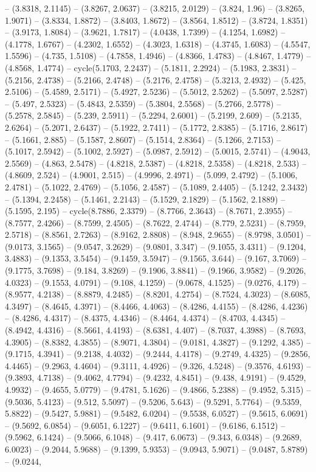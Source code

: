 -- (3.8318, 2.1145) -- (3.8267, 2.0637) -- (3.8215, 2.0129) -- (3.824, 1.96) -- (3.8265, 1.9071) -- (3.8334, 1.8872) -- (3.8403, 1.8672) -- (3.8564, 1.8512) -- (3.8724, 1.8351) -- (3.9173, 1.8084) -- (3.9621, 1.7817) -- (4.0438, 1.7399) -- (4.1254, 1.6982) -- (4.1778, 1.6767) -- (4.2302, 1.6552) -- (4.3023, 1.6318) -- (4.3745, 1.6083) -- (4.5547, 1.5596) -- (4.735, 1.5108) -- (4.7858, 1.4946) -- (4.8366, 1.4783) -- (4.8467, 1.4779) -- (4.8568, 1.4774) -- cycle(5.1703, 2.2437) -- (5.1811, 2.2924) -- (5.1983, 2.3831) -- (5.2156, 2.4738) -- (5.2166, 2.4748) -- (5.2176, 2.4758) -- (5.3213, 2.4932) -- (5.425, 2.5106) -- (5.4589, 2.5171) -- (5.4927, 2.5236) -- (5.5012, 2.5262) -- (5.5097, 2.5287) -- (5.497, 2.5323) -- (5.4843, 2.5359) -- (5.3804, 2.5568) -- (5.2766, 2.5778) -- (5.2578, 2.5845) -- (5.239, 2.5911) -- (5.2294, 2.6001) -- (5.2199, 2.609) -- (5.2135, 2.6264) -- (5.2071, 2.6437) -- (5.1922, 2.7411) -- (5.1772, 2.8385) -- (5.1716, 2.8617) -- (5.1661, 2.885) -- (5.1587, 2.8607) -- (5.1514, 2.8364) -- (5.1266, 2.7153) -- (5.1017, 2.5942) -- (5.1002, 2.5927) -- (5.0987, 2.5912) -- (5.0015, 2.5741) -- (4.9043, 2.5569) -- (4.863, 2.5478) -- (4.8218, 2.5387) -- (4.8218, 2.5358) -- (4.8218, 2.533) -- (4.8609, 2.524) -- (4.9001, 2.515) -- (4.9996, 2.4971) -- (5.099, 2.4792) -- (5.1006, 2.4781) -- (5.1022, 2.4769) -- (5.1056, 2.4587) -- (5.1089, 2.4405) -- (5.1242, 2.3432) -- (5.1394, 2.2458) -- (5.1461, 2.2143) -- (5.1529, 2.1829) -- (5.1562, 2.1889) -- (5.1595, 2.195) -- cycle(8.7886, 2.3379) -- (8.7766, 2.3643) -- (8.7671, 2.3955) -- (8.7577, 2.4266) -- (8.7599, 2.4505) -- (8.7622, 2.4744) -- (8.779, 2.5231) -- (8.7959, 2.5718) -- (8.8561, 2.7263) -- (8.9162, 2.8808) -- (8.948, 2.9655) -- (8.9798, 3.0501) -- (9.0173, 3.1565) -- (9.0547, 3.2629) -- (9.0801, 3.347) -- (9.1055, 3.4311) -- (9.1204, 3.4883) -- (9.1353, 3.5454) -- (9.1459, 3.5947) -- (9.1565, 3.644) -- (9.167, 3.7069) -- (9.1775, 3.7698) -- (9.184, 3.8269) -- (9.1906, 3.8841) -- (9.1966, 3.9582) -- (9.2026, 4.0323) -- (9.1553, 4.0791) -- (9.108, 4.1259) -- (9.0678, 4.1525) -- (9.0276, 4.179) -- (8.9577, 4.2138) -- (8.8879, 4.2485) -- (8.8201, 4.2754) -- (8.7524, 4.3023) -- (8.6085, 4.3497) -- (8.4645, 4.3971) -- (8.4466, 4.4063) -- (8.4286, 4.4155) -- (8.4286, 4.4236) -- (8.4286, 4.4317) -- (8.4375, 4.4346) -- (8.4464, 4.4374) -- (8.4703, 4.4345) -- (8.4942, 4.4316) -- (8.5661, 4.4193) -- (8.6381, 4.407) -- (8.7037, 4.3988) -- (8.7693, 4.3905) -- (8.8382, 4.3855) -- (8.9071, 4.3804) -- (9.0181, 4.3827) -- (9.1292, 4.385) -- (9.1715, 4.3941) -- (9.2138, 4.4032) -- (9.2444, 4.4178) -- (9.2749, 4.4325) -- (9.2856, 4.4465) -- (9.2963, 4.4604) -- (9.3111, 4.4926) -- (9.326, 4.5248) -- (9.3576, 4.6193) -- (9.3893, 4.7138) -- (9.4062, 4.7794) -- (9.4232, 4.8451) -- (9.438, 4.9191) -- (9.4529, 4.9932) -- (9.4655, 5.0779) -- (9.4781, 5.1626) -- (9.4866, 5.2388) -- (9.4952, 5.315) -- (9.5036, 5.4123) -- (9.512, 5.5097) -- (9.5206, 5.643) -- (9.5291, 5.7764) -- (9.5359, 5.8822) -- (9.5427, 5.9881) -- (9.5482, 6.0204) -- (9.5538, 6.0527) -- (9.5615, 6.0691) -- (9.5692, 6.0854) -- (9.6051, 6.1227) -- (9.6411, 6.1601) -- (9.6186, 6.1512) -- (9.5962, 6.1424) -- (9.5066, 6.1048) -- (9.417, 6.0673) -- (9.343, 6.0348) -- (9.2689, 6.0023) -- (9.2044, 5.9688) -- (9.1399, 5.9353) -- (9.0943, 5.9071) -- (9.0487, 5.8789) -- (9.0244, 